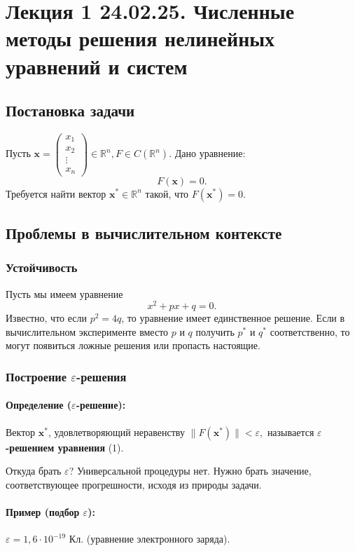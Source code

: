 \section{Лекция 1 24.02.25. Численные методы решения нелинейных уравнений и систем}
\subsection{Постановка задачи}
Пусть $\mathbf{x} = \begin{pmatrix} 
x_1    \\ 
x_2    \\ 
\vdots \\ 
x_n    
\end{pmatrix} \in \mathbb{R}^n, F \in C(\mathbb{R}^n).
$
Дано уравнение:
\begin{equation}
	F(\mathbf{x}) = 0. 
\end{equation}
Требуется найти вектор $\mathbf{x^*} \in \mathbb{R}^n$ такой, что $F(\mathbf{x^*}) = 0$.
\subsection{Проблемы в вычислительном контексте}
\subsubsection{Устойчивость}
Пусть мы имеем уравнение
\[
	x^2 + px + q = 0.
\]
Известно, что если $p^2 = 4q$,
то уравнение имеет единственное решение.
Если в вычислительном эксперименте вместо $p$ и $q$ получить $p^*$ и $q^*$ соответственно, то могут появиться ложные решения или пропасть настоящие.
\subsubsection{Построение $\varepsilon$-решения}
\paragraph{Определение ($\varepsilon$-решение):} Вектор $\mathbf{x^*}$, удовлетворяющий неравенству
$
\|F(\mathbf{x^*})\| < \varepsilon,
$
называется \textbf{$\varepsilon$-решением уравнения} (1).

Откуда брать $\varepsilon$? Универсальной процедуры нет. Нужно брать значение, соответствующее прогрешности, исходя из природы задачи.
\paragraph{Пример (подбор $\varepsilon$):} 
$\varepsilon = 1,6 \cdot 10^{-19}$ Кл. (уравнение электронного заряда).
